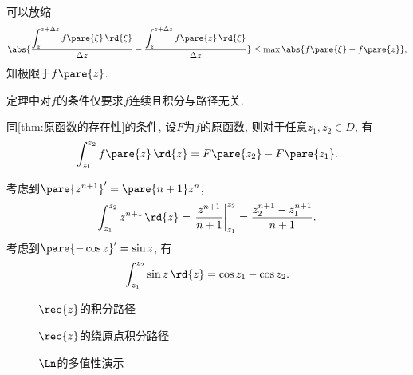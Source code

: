 \documentclass{ctexart}
\begin{document}
可以放缩
\[ \abs{\frac{\displaystyle \int_z^{z+\Delta z}f\pare{\xi}\,\rd{\xi}}{\Delta z} - \frac{\displaystyle \int_z^{z+\Delta z}f\pare{z}\,\rd{\xi}}{\Delta z}} \le {\max \abs{f\pare{\xi} - f\pare{z}}}, \]
知极限于$f\pare{z}$.
\begin{remark}
    定理中对$f$的条件仅要求$f$连续且积分与路径无关.
\end{remark}
\begin{theorem}
    同\cref{thm:原函数的存在性}的条件, 设$F$为$f$的原函数, 则对于任意$z_1, z_2\in D$, 有
    \[ \int_{z_1}^{z_2}f\pare{z}\,\rd{z} = F\pare{z_2} - F\pare{z_1}. \]
\end{theorem}
\begin{sample}
    \begin{ex}
        考虑到$\pare{z^{n+1}}' = \pare{n+1}z^n$,
        \[ \int_{z_1}^{z_2} z^{n+1}\,\rd{z} = \left.\frac{z^{n+1}}{n+1}\right\vert_{z_1}^{z_2} = \frac{z_2^{n+1} - z_1^{n+1}}{n+1}. \]
        考虑到$\pare{-\cos z}' = \sin z$, 有
        \[ \int_{z_1}^{z_2}\sin z\,\rd{z} = \cos z_1 - \cos z_2. \]
    \end{ex}
\end{sample}
\begin{figure}[ht]
    \centering
    \caption{$\displaystyle \rec{z}$的积分路径}
    \label{fig:1/z的积分路径}
\end{figure}
\begin{figure}[ht]
    \centering
    \caption{$\displaystyle \rec{z}$的绕原点积分路径}
    \label{fig:1/z的绕原点积分路径}
\end{figure}
\begin{figure}[ht]
    \centering
    \caption{$\Ln$的多值性演示}
    \label{fig:Ln的多值性演示}
\end{figure}
\end{document}
